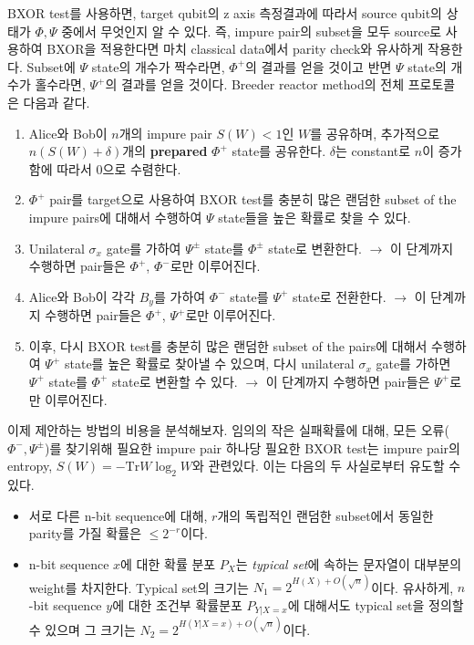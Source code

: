 \documentclass[
]{kaohandt}
\begin{document}
BXOR test를 사용하면, target qubit의 z axis 측정결과에 따라서 source qubit의 상태가 $\Phi, \Psi$ 중에서 무엇인지 알 수 있다. 즉, impure pair의 subset을 모두 source로 사용하여 BXOR을 적용한다면 마치 classical data에서 parity check와 유사하게 작용한다. 
Subset에 $\Psi$ state의 개수가 짝수라면, $\Phi^+$의 결과를 얻을 것이고 반면 $\Psi$ state의 개수가 홀수라면, $\Psi^+$의 결과를 얻을 것이다.
Breeder reactor method의 전체 프로토콜은 다음과 같다.
\begin{enumerate}
    \item Alice와 Bob이 $n$개의 impure pair $S(W) < 1$인 $W$를 공유하며, 추가적으로 $n(S(W) + \delta)$개의 \textbf{prepared} $\Phi^+$ state를 공유한다. $\delta$는 constant로 $n$이 증가함에 따라서 0으로 수렴한다.
    \item $\Phi^+$ pair를 target으로 사용하여 BXOR test를 충분히 많은 랜덤한 subset of the impure pairs에 대해서 수행하여  $\Psi$ state들을 높은 확률로 찾을 수 있다. 
    \item Unilateral $\sigma_x$ gate를 가하여 $\Psi^{\pm}$ state를 $\Phi^{\pm}$ state로 변환한다. $\rightarrow$ 이 단계까지 수행하면 pair들은 $\Phi^+$, $\Phi^-$로만 이루어진다.
    \item Alice와 Bob이 각각 $B_y$를 가하여 $\Phi^-$ state를 $\Psi^+$ state로 전환한다. $\rightarrow$ 이 단계까지 수행하면 pair들은 $\Phi^+$, $\Psi^+$로만 이루어진다.
    \item 이후, 다시 BXOR test를 충분히 많은 랜덤한 subset of the pairs에 대해서 수행하여 $\Psi^+$ state를 높은 확률로 찾아낼 수 있으며, 다시 unilateral $\sigma_x$ gate를 가하면 $\Psi^+$ state를 $\Phi^+$ state로 변환할 수 있다. $\rightarrow$ 이 단계까지 수행하면 pair들은 $\Psi^+$로만 이루어진다.
\end{enumerate}

이제 제안하는 방법의 비용을 분석해보자. 임의의 작은 실패확률에 대해, 모든 오류($\Phi^-, \Psi^\pm$)를 찾기위해 필요한 impure pair 하나당 필요한 BXOR test는 impure pair의 entropy, $S(W) = -\text{Tr}W \log_2W$와 관련있다. 이는 다음의 두 사실로부터 유도할 수 있다.
\begin{itemize}
    \item 서로 다른 n-bit sequence에 대해, $r$개의 독립적인 랜덤한 subset에서 동일한 parity를 가질 확률은 $\leq 2^{-r}$이다.
	\item n-bit sequence $x$에 대한 확률 분포 $P_X$는 \textit{typical set}에 속하는 문자열이 대부분의 weight를 차지한다. Typical set의 크기는 $N_1 = 2^{H(X) + O(\sqrt{n})}$이다. 유사하게, $n$-bit sequence $y$에 대한 조건부 확률분포 $P_{Y|X=x}$에 대해서도 typical set을 정의할 수 있으며 그 크기는 $N_2 = 2^{H(Y|X=x) + O(\sqrt n)}$이다.
\end{itemize}
\end{document}

